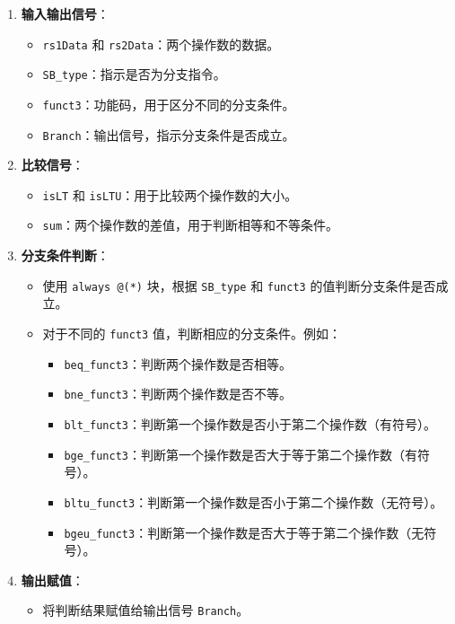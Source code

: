 \documentclass[12pt,hyperref,a4paper,UTF8]{ctexart}
\begin{document}
\begin{enumerate}
    \item \textbf{输入输出信号}：
    \begin{itemize}
        \item \texttt{rs1Data} 和 \texttt{rs2Data}：两个操作数的数据。
        \item \texttt{SB\_type}：指示是否为分支指令。
        \item \texttt{funct3}：功能码，用于区分不同的分支条件。
        \item \texttt{Branch}：输出信号，指示分支条件是否成立。
    \end{itemize}

    \item \textbf{比较信号}：
    \begin{itemize}
        \item \texttt{isLT} 和 \texttt{isLTU}：用于比较两个操作数的大小。
        \item \texttt{sum}：两个操作数的差值，用于判断相等和不等条件。
    \end{itemize}

    \item \textbf{分支条件判断}：
    \begin{itemize}
        \item 使用 \texttt{always @(*)} 块，根据 \texttt{SB\_type} 和 \texttt{funct3} 的值判断分支条件是否成立。
        \item 对于不同的 \texttt{funct3} 值，判断相应的分支条件。例如：
        \begin{itemize}
            \item \texttt{beq\_funct3}：判断两个操作数是否相等。
            \item \texttt{bne\_funct3}：判断两个操作数是否不等。
            \item \texttt{blt\_funct3}：判断第一个操作数是否小于第二个操作数（有符号）。
            \item \texttt{bge\_funct3}：判断第一个操作数是否大于等于第二个操作数（有符号）。
            \item \texttt{bltu\_funct3}：判断第一个操作数是否小于第二个操作数（无符号）。
            \item \texttt{bgeu\_funct3}：判断第一个操作数是否大于等于第二个操作数（无符号）。
        \end{itemize}
    \end{itemize}

    \item \textbf{输出赋值}：
    \begin{itemize}
        \item 将判断结果赋值给输出信号 \texttt{Branch}。
    \end{itemize}
\end{enumerate}
\end{document}
